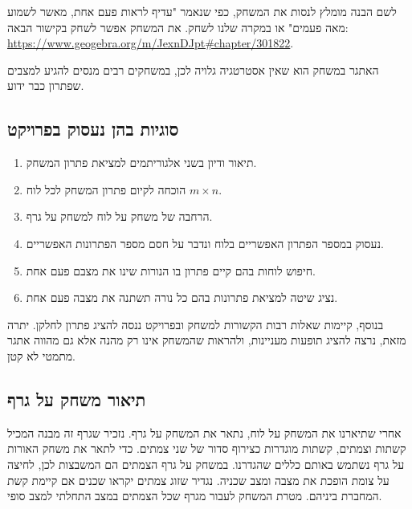 \documentclass[12pt,leqno]{article}
\theoremstyle{theoremdd}
\begin{document}
לשם הבנה מומלץ לנסות את המשחק,
כפי שנאמר "עדיף לראות פעם אחת, מאשר לשמוע מאה פעמים"
או במקרה שלנו לשחק.
את המשחק אפשר לשחק בקישור הבאה:
\\
\url{https://www.geogebra.org/m/JexnDJpt#chapter/301822}.

האתגר במשחק הוא שאין אסטרטגיה גלויה
לכן, במשחקים רבים מנסים להגיע למצבים שפתרון כבר ידוע.

\subsection{סוגיות בהן נעסוק בפרויקט}
\begin{enumerate}
	\item 
תיאור ודיון בשני אלגוריתמים למציאת פתרון המשחק.
	\item 
הוכחה לקיום פתרון המשחק לכל לוח
	$m\times n$.
	\item 
הרחבה של משחק על לוח למשחק על גרף.
    \item 
נעסוק במספר הפתרון האפשריים בלוח ונדבר על חסם מספר הפתרונות האפשריים.
	\item 
חיפוש לוחות בהם קיים פתרון בו הנורות שינו את מצבם פעם אחת.
    \item 
נציג שיטה למציאת פתרונות בהם כל נורה תשתנה את מצבה פעם אחת.
\end{enumerate}
בנוסף, קיימות שאלות רבות הקשורות למשחק
ובפרויקט ננסה להציג פתרון לחלקן.
יתרה מזאת, נרצה להציג תופעות מעניינות, ולהראות
שהמשחק אינו רק מהנה אלא גם מהווה אתגר מתמטי לא קטן.

\subsection{תיאור משחק על גרף}
אחרי שתיארנו את המשחק על לוח, נתאר את המשחק על גרף.
נזכיר שגרף זה מבנה המכיל קשתות וצמתים, קשתות מוגדרות כצירוף סדור של שני צמתים.
כדי לתאר את משחק האורות על גרף נשתמש באותם כללים שהגדרנו.
במשחק על גרף הצמתים הם המשבצות
לכן, לחיצה על צומת הופכת את מצבה ומצב שכניה.
נגדיר שזוג צמתים יקראו שכנים אם קיימת
קשת המחברת ביניהם.
מטרת המשחק לעבור מגרף שכל הצמתים במצב התחלתי למצב סופי.
\end{document}
